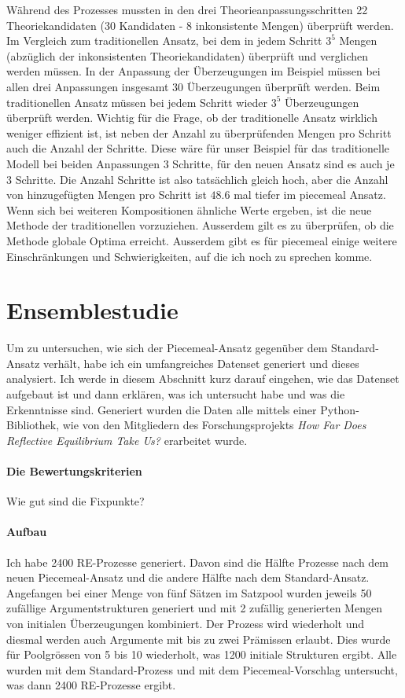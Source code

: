 \documentclass{article}
\begin{document}
 Während des Prozesses mussten in den drei Theorieanpassungsschritten 22 Theoriekandidaten (30 Kandidaten - 8 inkonsistente Mengen) überprüft werden.  Im Vergleich zum traditionellen Ansatz, bei dem in jedem Schritt $3^5$ Mengen (abzüglich der inkonsistenten Theoriekandidaten) überprüft und verglichen werden müssen. In der Anpassung der Überzeugungen im Beispiel müssen bei allen drei Anpassungen insgesamt 30 Überzeugungen überprüft werden. Beim traditionellen Ansatz müssen bei jedem Schritt wieder $3^5$ Überzeugungen überprüft werden. Wichtig für die Frage, ob der traditionelle Ansatz wirklich weniger effizient ist, ist neben der Anzahl zu überprüfenden Mengen pro Schritt auch die Anzahl der Schritte. Diese wäre für unser Beispiel für das traditionelle Modell bei beiden Anpassungen 3 Schritte, für den neuen Ansatz sind es auch je 3 Schritte. Die Anzahl Schritte ist also tatsächlich gleich hoch, aber die Anzahl von hinzugefügten Mengen pro Schritt ist $48.6$ mal tiefer im piecemeal Ansatz. Wenn sich bei weiteren Kompositionen ähnliche Werte ergeben, ist die neue Methode der traditionellen vorzuziehen. Ausserdem gilt es zu überprüfen, ob die Methode globale Optima erreicht. Ausserdem gibt es für piecemeal einige weitere Einschränkungen und Schwierigkeiten, auf die ich noch zu sprechen komme.

\section{Ensemblestudie} \label{Ensemblestudie}

Um zu untersuchen, wie sich der Piecemeal-Ansatz gegenüber dem Standard-Ansatz verhält, habe ich ein umfangreiches Datenset generiert und dieses analysiert. Ich werde in diesem Abschnitt kurz darauf eingehen, wie das Datenset aufgebaut ist und dann erklären, was ich untersucht habe und was die Erkenntnisse sind. Generiert wurden die Daten alle mittels einer Python-Bibliothek, wie von den Mitgliedern des Forschungsprojekts \textit{How Far Does Reflective Equilibrium Take Us?} erarbeitet wurde.

\paragraph{Die Bewertungskriterien} Wie gut sind die Fixpunkte? 

\paragraph{Aufbau} Ich habe 2400 RE-Prozesse generiert. Davon sind die Hälfte Prozesse nach dem neuen Piecemeal-Ansatz und die andere Hälfte nach dem Standard-Ansatz. Angefangen bei einer Menge von fünf Sätzen im Satzpool wurden jeweils 50 zufällige Argumentstrukturen generiert und mit 2 zufällig generierten Mengen von initialen Überzeugungen kombiniert. Der Prozess wird wiederholt und diesmal werden auch Argumente mit bis zu zwei Prämissen erlaubt. Dies wurde für Poolgrössen von 5 bis 10 wiederholt, was 1200 initiale Strukturen ergibt. Alle wurden mit dem Standard-Prozess und mit dem Piecemeal-Vorschlag untersucht, was dann 2400 RE-Prozesse ergibt.
\end{document}

